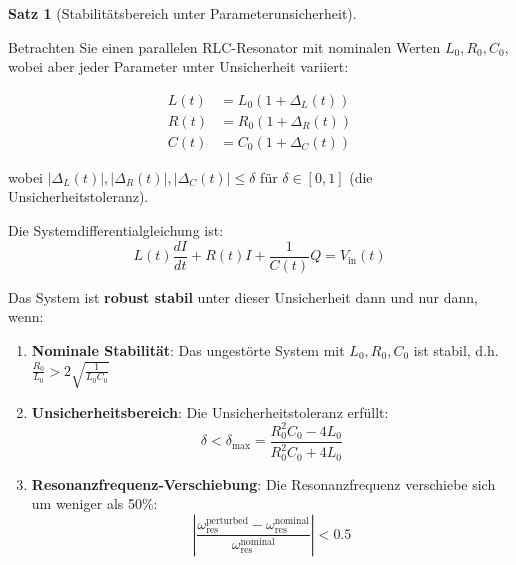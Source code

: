 \documentclass[a4paper,12pt,twoside]{report}
\theoremstyle{definition}
\newtheorem{satz}{Satz}
\begin{document}
\begin{satz}[Stabilitätsbereich unter Parameterunsicherheit]
\label{satz:stabilitaet_unsicherheit}

Betrachten Sie einen parallelen RLC-Resonator mit nominalen Werten $L_0, R_0, C_0$, wobei aber jeder Parameter unter Unsicherheit variiert:

\begin{align}
L(t) &= L_0 (1 + \Delta_L(t)) \\
R(t) &= R_0 (1 + \Delta_R(t)) \\
C(t) &= C_0 (1 + \Delta_C(t))
\end{align}

wobei $|\Delta_L(t)|, |\Delta_R(t)|, |\Delta_C(t)| \leq \delta$ für $\delta \in [0,1]$ (die Unsicherheitstoleranz).

Die Systemdifferentialgleichung ist:
\begin{equation}
L(t) \frac{dI}{dt} + R(t) I + \frac{1}{C(t)} Q = V_{\text{in}}(t)
\end{equation}

Das System ist \textbf{robust stabil} unter dieser Unsicherheit dann und nur dann, wenn:

\begin{enumerate}
    \item \textbf{Nominale Stabilität}: Das ungestörte System mit $L_0, R_0, C_0$ ist stabil, d.h. $\frac{R_0}{L_0} > 2\sqrt{\frac{1}{L_0 C_0}}$
    
    \item \textbf{Unsicherheitsbereich}: Die Unsicherheitstoleranz erfüllt:
    \begin{equation}
    \delta < \delta_{\max} = \frac{R_0^2 C_0 - 4L_0}{R_0^2 C_0 + 4L_0}
    \end{equation}
    
    \item \textbf{Resonanzfrequenz-Verschiebung}: Die Resonanzfrequenz verschiebe sich um weniger als 50\%:
    \begin{equation}
    \left| \frac{\omega_{\text{res}}^{\text{perturbed}} - \omega_{\text{res}}^{\text{nominal}}}{\omega_{\text{res}}^{\text{nominal}}} \right| < 0.5
    \end{equation}
\end{enumerate}

\end{satz}
\end{document}
